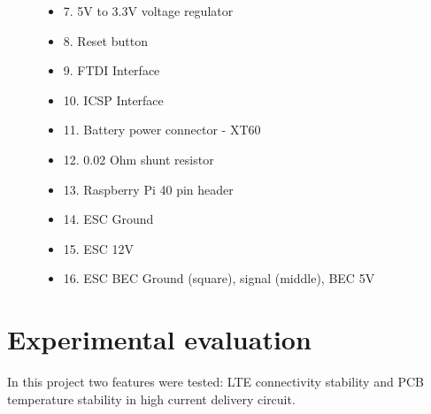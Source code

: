 \documentclass{IEEEtran}
\begin{document}
\begin{figure}
\begin{multicols}{2}
\begin{itemize}
    \item[] 7. 5V to 3.3V voltage regulator
    \item[] 8. Reset button
    \item[] 9. FTDI Interface
    \item[] 10. ICSP Interface
    \item[] 11. Battery power connector - XT60 
    \item[] 12. 0.02 Ohm shunt resistor
    \item[] 13. Raspberry Pi 40 pin header
    \item[] 14. ESC Ground
    \item[] 15. ESC 12V
    \item[] 16. ESC BEC Ground (square), signal (middle), BEC 5V
\end{itemize}
\end{multicols}
\end{figure}
\clearpage
\pagebreak
\section{Experimental evaluation}
In this project two features were tested: LTE connectivity stability and PCB temperature stability in high current delivery circuit.
\end{document}
